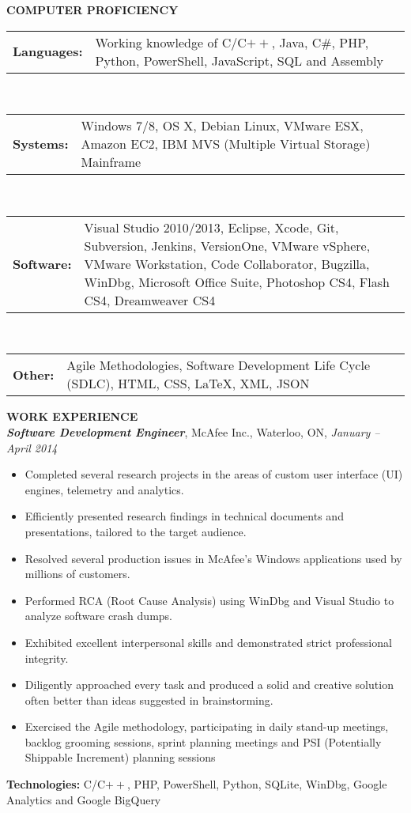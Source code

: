 \documentclass[10pt,letterpaper]{article}
\newcommand{\proficiency}[2]
{
\begin{tabular}{p{0.1\columnwidth} p{0.80\columnwidth}}
    \textbf{#1} & #2
\end{tabular}
}
\newcommand{\job}[4]
{
    \emph{\textbf{#1}}, #2, #3, \emph{#4}
}
\begin{document}
\textbf{COMPUTER PROFICIENCY} \hrulefill \\
\begin{adjustwidth}{0.1in}{0.5in}
    \proficiency{Languages:}{ Working knowledge of C/C$++$, Java, C\#, PHP, Python, PowerShell, JavaScript, SQL 
			     and Assembly }\\
    \proficiency{Systems:}  { Windows 7/8, OS X, Debian Linux, VMware ESX, Amazon EC2,
			      IBM MVS (Multiple Virtual Storage) Mainframe }\\
    \proficiency{Software:} { Visual Studio 2010/2013, Eclipse, Xcode, Git, Subversion, Jenkins, VersionOne, 
			      VMware vSphere, VMware Workstation, Code Collaborator, Bugzilla, WinDbg, 
			      Microsoft Office Suite, Photoshop CS4, Flash CS4, Dreamweaver CS4 }\\
    \proficiency{Other:}    { Agile Methodologies, Software Development Life Cycle (SDLC), HTML, CSS, \LaTeX, XML,
			      JSON }
\end{adjustwidth}
\vspace{0.5em}
\textbf{WORK EXPERIENCE} \hrulefill \\[0.5em]
\job{Software Development Engineer}{McAfee Inc.}{Waterloo, ON}{January -- April 2014}\\
\begin{adjustwidth}{0.1in}{0.5in}
    \begin{itemize}
	\item Completed several research projects in the areas of custom user interface (UI) engines, telemetry and analytics.
	\item Efficiently presented research findings in technical documents and presentations, tailored to the target audience.
	\item Resolved several production issues in McAfee's Windows applications used by millions of customers.
	\item Performed RCA (Root Cause Analysis) using WinDbg and Visual Studio to analyze software crash dumps.
    	\item Exhibited excellent interpersonal skills and demonstrated strict professional integrity.
	\item Diligently approached every task and produced a solid and creative solution often better than 
	    ideas suggested in brainstorming.
	\item Exercised the Agile methodology, participating in daily stand-up meetings, backlog grooming sessions, 
	    sprint planning meetings and PSI (Potentially Shippable Increment) planning sessions
    \end{itemize}
    \vspace{0.5em}
    \textbf{Technologies:} C/C$++$, PHP, PowerShell, Python, SQLite, WinDbg, Google Analytics and Google BigQuery 
\end{adjustwidth}
\end{document}
